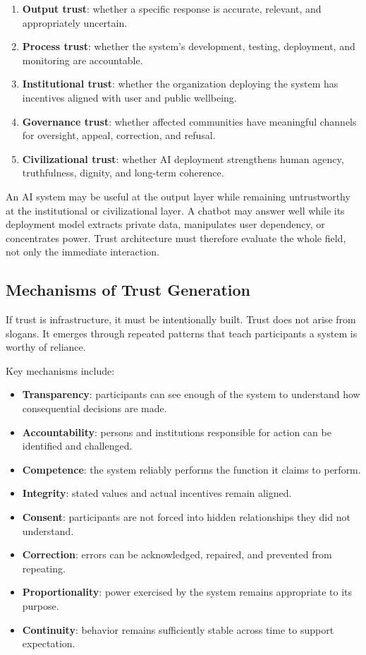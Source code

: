 \documentclass[12pt]{article}
\begin{document}
\begin{enumerate}
  \item \textbf{Output trust}: whether a specific response is accurate, relevant, and appropriately uncertain.
  \item \textbf{Process trust}: whether the system's development, testing, deployment, and monitoring are accountable.
  \item \textbf{Institutional trust}: whether the organization deploying the system has incentives aligned with user and public wellbeing.
  \item \textbf{Governance trust}: whether affected communities have meaningful channels for oversight, appeal, correction, and refusal.
  \item \textbf{Civilizational trust}: whether AI deployment strengthens human agency, truthfulness, dignity, and long-term coherence.
\end{enumerate}

An AI system may be useful at the output layer while remaining untrustworthy at the institutional or civilizational layer. A chatbot may answer well while its deployment model extracts private data, manipulates user dependency, or concentrates power. Trust architecture must therefore evaluate the whole field, not only the immediate interaction.

\subsection{Mechanisms of Trust Generation}

If trust is infrastructure, it must be intentionally built. Trust does not arise from slogans. It emerges through repeated patterns that teach participants a system is worthy of reliance.

Key mechanisms include:

\begin{itemize}
  \item \textbf{Transparency}: participants can see enough of the system to understand how consequential decisions are made.
  \item \textbf{Accountability}: persons and institutions responsible for action can be identified and challenged.
  \item \textbf{Competence}: the system reliably performs the function it claims to perform.
  \item \textbf{Integrity}: stated values and actual incentives remain aligned.
  \item \textbf{Consent}: participants are not forced into hidden relationships they did not understand.
  \item \textbf{Correction}: errors can be acknowledged, repaired, and prevented from repeating.
  \item \textbf{Proportionality}: power exercised by the system remains appropriate to its purpose.
  \item \textbf{Continuity}: behavior remains sufficiently stable across time to support expectation.
\end{itemize}
\end{document}
